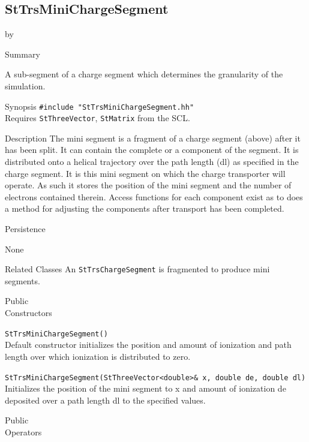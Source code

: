 \documentclass[twoside]{article}
\newcommand{\comp}[1]{\texttt{#1}}%
\newcommand{\entrylabel}[1]{\mbox{\textbf{{#1}}}\hfil}%
\newenvironment{entry}
{\begin{list}{}%
    {\renewcommand{\makelabel}{\entrylabel}%
     \setlength{\labelwidth}{90pt}%
     \setlength{\leftmargin}{\labelwidth}
     \advance\leftmargin by \labelsep%
      }%
    }%
  {\end{list}}
\newcommand{\Entrylabel}[1]%
{\raisebox{0pt}[1ex][0pt]{\makebox[\labelwidth][l]%
    {\parbox[t]{\labelwidth}{\hspace{0pt}\textbf{{#1}}}}}}
\newenvironment{Entry}%
{\renewcommand{\entrylabel}{\Entrylabel}\begin{entry}}%
  {\end{entry}}
\begin{document}
\subsection{StTrsMiniChargeSegment} 
\label{sec:stTrsMiniChargeSegment}

\begin{Entry}
\item[Summary]

  A sub-segment of a charge segment which determines the granularity
  of the simulation.

\item[Synopsis]
  \verb+#include "StTrsMiniChargeSegment.hh"+\\
  Requires \comp{StThreeVector}, \comp{StMatrix} from the SCL.

\item[Description]
  The mini segment is a fragment of a charge segment (above) after it
  has been split.  It can contain the complete or a component of the
  segment.  It is distributed onto a helical trajectory over the path length
  (dl) as specified in the charge segment.  It is this mini segment on which
  the charge transporter will operate.  As such it stores
  the position of the mini segment and the number of electrons contained
  therein.  Access functions for each component exist as to does a method
  for adjusting the components after transport has been completed.

\item[Persistence]

  None

\item[Related Classes]
 An \comp{StTrsChargeSegment} is fragmented to produce mini segments.

\item[Public \\ Constructors]
  
   \verb+StTrsMiniChargeSegment()+\\
   Default constructor initializes the position and amount of ionization
   and path length over which ionization is distributed to zero.

   \verb+StTrsMiniChargeSegment(StThreeVector<double>& x, double de, double dl)+\\
   Initializes the position of the mini segment to x and amount of
   ionization de deposited over a path length dl to the specified values.

\item[Public \\ Operators]


\end{Entry}
\end{document}
